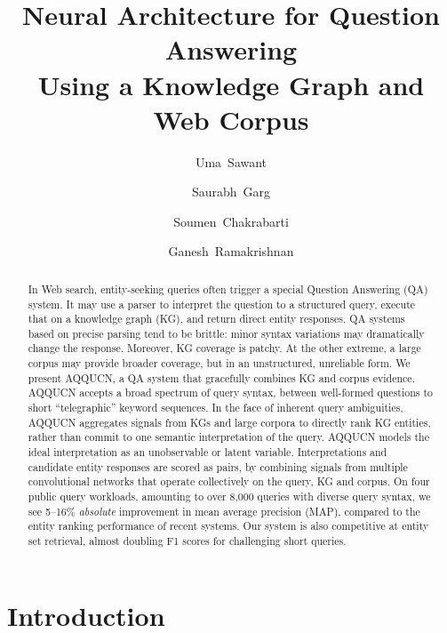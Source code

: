 \documentclass{svjour3}
\begin{document}
\title{Neural Architecture for Question Answering \\
  Using a Knowledge Graph and Web Corpus}

\author{Uma~Sawant \and Saurabh~Garg \and 
Soumen~Chakrabarti \and Ganesh~Ramakrishnan}

\institute{\relax}

\maketitle


\begin{abstract}
In Web search, entity-seeking queries often trigger a special Question Answering (QA) system.  It may use a parser to interpret the question to a structured query, execute that on a knowledge graph (KG), and return direct entity responses.  QA systems based on precise parsing tend to be brittle: minor syntax variations may dramatically change the response.  Moreover, KG coverage is patchy.  At the other extreme, a large corpus may provide broader coverage, but in an unstructured, unreliable form.  We present AQQUCN, a QA system that gracefully combines KG and corpus evidence.  AQQUCN accepts a broad spectrum of query syntax, between well-formed questions to short ``telegraphic'' keyword sequences.  In the face of inherent query ambiguities, AQQUCN aggregates signals from KGs and large corpora to directly rank KG entities, rather than commit to one semantic interpretation of the query.  AQQUCN models the ideal interpretation as an unobservable or latent variable.  Interpretations and candidate entity responses are scored as pairs, by combining signals from multiple convolutional networks that operate collectively on the query, KG and corpus.  On four public query workloads, amounting to over 8,000 queries with diverse query syntax, we see 5--16\% \emph{absolute} improvement in mean average precision (MAP), compared to the entity ranking performance of recent systems.  Our system is also competitive at entity set retrieval, almost doubling F1 scores for challenging short queries.
\end{abstract}


\section{Introduction}
\label{sec:Intro}
\end{document}

